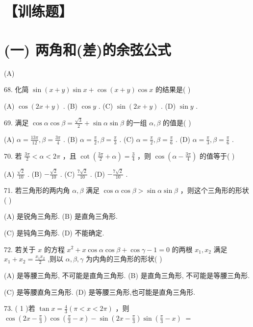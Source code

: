 \documentclass[10pt]{article}
\begin{document}
\section*{【训练题】}

\section*{(一) 两角和(差)的余弦公式}

(A)

68. 化简 \(\sin \left( {x + y}\right) \sin x + \cos \left( {x + y}\right) \cos x\) 的结果是( )

(A) \(\cos \left( {{2x} + y}\right)\) . (B) \(\cos y\) . (C) \(\sin \left( {{2x} + y}\right)\) . (D) \(\sin y\) .

69. 满足 \(\cos \alpha \cos \beta  = \frac{\sqrt{3}}{2} + \sin \alpha \sin \beta\) 的一组 \(\alpha ,\beta\) 的值是( )

(A) \(\alpha  = \frac{13\pi }{12},\beta  = \frac{3\pi }{4}\) . (B) \(\alpha  = \frac{\pi }{2},\beta  = \frac{\pi }{3}\) . (C) \(\alpha  = \frac{\pi }{2},\beta  = \frac{\pi }{6}\) . (D) \(\alpha  = \frac{\pi }{3},\beta  = \frac{\pi }{6}\) .

70. 若 \(\frac{3\pi }{2} < \alpha  < {2\pi }\) ，且 \(\cot \left( {\frac{3\pi }{2} + \alpha }\right)  = \frac{3}{4}\) ，则 \(\cos \left( {\alpha  - \frac{3\pi }{4}}\right)\) 的值等于( )

(A) \(\frac{\sqrt{2}}{10}\) . (B) \(- \frac{\sqrt{2}}{10}\) . (C) \(\frac{7\sqrt{2}}{10}\) . (D) \(- \frac{7\sqrt{2}}{10}\) .

71. 若三角形的两内角 \(\alpha ,\beta\) 满足 \(\cos \alpha \cos \beta  > \sin \alpha \sin \beta\) ，则这个三角形的形状( )

(A) 是锐角三角形. (B) 是直角三角形.

(C) 是钝角三角形. (D) 不能确定.

72. 若关于 \(x\) 的方程 \({x}^{2} + x\cos \alpha \cos \beta  + \cos \gamma  - 1 = 0\) 的两根 \({x}_{1},{x}_{2}\) 满足 \({x}_{1} + {x}_{2} = \frac{{x}_{1}{x}_{2}}{2}\) ,则以 \(\alpha ,\beta ,\gamma\) 为内角的三角形的形状( )

(A) 是等腰三角形, 不可能是直角三角形. (B) 是直角三角形, 不可能是等腰三角形.

(C) 是等腰直角三角形. (D) 是等腰三角形,也可能是直角三角形.

73. ( 1 )若 \(\tan x = \frac{4}{3}\left( {\pi  < x < {2\pi }}\right)\) ，则 \(\cos \left( {{2x} - \frac{\pi }{3}}\right) \cos \left( {\frac{\pi }{3} - x}\right)  - \sin \left( {{2x} - \frac{\pi }{3}}\right) \sin \left( {\frac{\pi }{3} - x}\right) \; =\)
\end{document}
